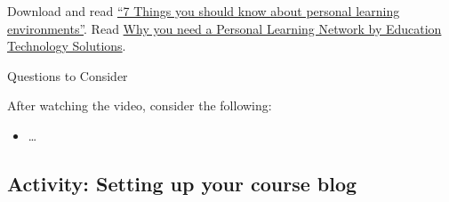 \documentclass[
]{book}
\providecommand{\tightlist}{%
  \setlength{\itemsep}{0pt}\setlength{\parskip}{0pt}}
\theoremstyle{definition}
\theoremstyle{definition}
\theoremstyle{definition}
\theoremstyle{definition}
\theoremstyle{remark}
\begin{document}
\begin{reflect}
Download and read \href{https://library.educause.edu/resources/2009/5/7-things-you-should-know-about-personal-learning-environments}{``7 Things you should know about personal learning environments''}.
Read \href{https://educationtechnologysolutions.com/2014/07/why-you-need-a-personal-learning-network/}{Why you need a Personal Learning Network by Education Technology Solutions}.

{Questions to Consider}

After watching the video, consider the following:

\begin{itemize}
\tightlist
\item
  \ldots{}
\end{itemize}
\end{reflect}

\hypertarget{activity-setting-up-your-course-blog}{%
\subsection*{Activity: Setting up your course blog}\label{activity-setting-up-your-course-blog}}
\end{document}
